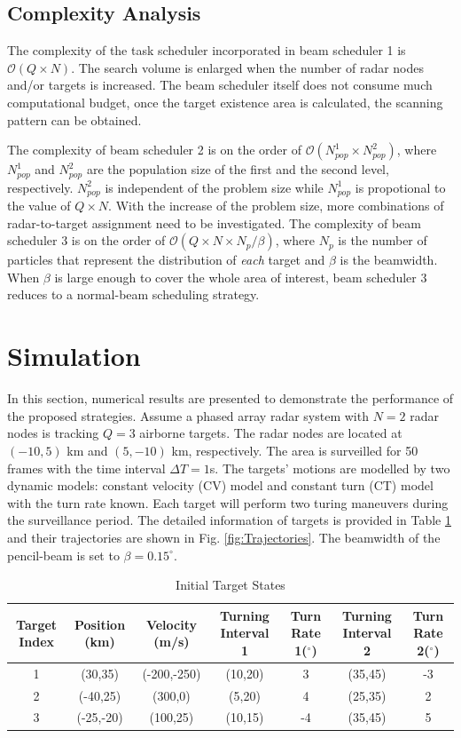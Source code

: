 \documentclass[12pt,journal,draftclsnofoot,onecolumn]{IEEEtran}
\begin{document}
\subsection{Complexity Analysis}
\label{sec:complexity}
The complexity of the task scheduler incorporated in beam scheduler 1 is $\mathcal{O}(Q\times N)$. The search volume is enlarged when the number of radar nodes and/or targets is increased. The beam scheduler itself does not consume much computational budget, once the target existence area is calculated, the scanning pattern can be obtained.

The complexity of beam scheduler 2 is on the order of $\mathcal{O}(N_{pop}^1\times N_{pop}^2)$, where $N_{pop}^1$ and $N_{pop}^2$ are the population size of the first and the second level, respectively. $N_{pop}^2$ is independent of the problem size while $N_{pop}^1$ is propotional to the value of $Q\times N$. With the increase of the problem size, more combinations of radar-to-target assignment need to be investigated. The complexity of beam scheduler 3 is on the order of $\mathcal{O}(Q\times N\times N_p/\beta)$, where $N_p$ is the number of particles that represent the distribution of \emph{each} target and $\beta$ is the beamwidth. When $\beta$ is large enough to cover the whole area of interest, beam scheduler 3 reduces to a normal-beam scheduling strategy. 


\section{Simulation}
In this section, numerical results are presented to demonstrate the performance of the proposed strategies. Assume a phased array radar system with $N=2$ radar nodes is tracking $Q=3$ airborne targets. The radar nodes are located at $(-10,5)$ km and $(5,-10)$ km, respectively. The area is surveilled for 50 frames with the time interval $\Delta T = 1$s. The targets' motions are modelled by two dynamic models: constant velocity (CV) model and constant turn (CT) model with the turn rate known. Each target will perform two turing maneuvers during the surveillance period. The detailed information of targets is provided in Table \ref{tab:Target State} and their trajectories are shown in Fig. \ref{fig:Trajectories}. The beamwidth of the pencil-beam is set to $\beta=0.15^\circ$.

\begin{table}
	\centering
	\caption{Initial Target States}
	\begin{tabular}{ccccccc}
		\toprule
		Target Index & Position (km) & Velocity (m/s) & Turning Interval 1 & Turn Rate 1($^\circ$) & Turning Interval 2 & Turn Rate 2($^\circ$) \\ \midrule
		1 & (30,35) & (-200,-250) & (10,20) & 3 & (35,45) & -3\\ 
		2 & (-40,25) & (300,0) & (5,20) & 4 & (25,35) & 2\\ 
		3 & (-25,-20) & (100,25) & (10,15) & -4 & (35,45) & 5\\ 

		\bottomrule
	\end{tabular}
	\label{tab:Target State}
\end{table}  
\end{document}
